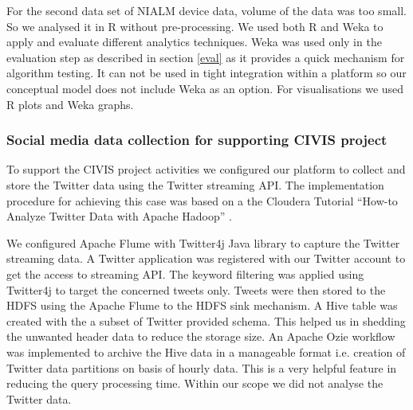  For the second data set of NIALM device data, volume of the data was too small. So we analysed it in R without pre-processing. We used both R and Weka to apply and evaluate different analytics techniques. Weka was used only in the evaluation step as described in section \ref{eval} as it provides a quick mechanism for algorithm testing. It can not be used in tight integration within a platform so our conceptual model does not include Weka as an option. For visualisations we used R plots and Weka graphs.
 
 \subsubsection{Social media data collection for supporting CIVIS project}
 To support the CIVIS project activities we configured our platform to collect and store the Twitter data using the Twitter streaming API. The implementation procedure for achieving this case was based on a the Cloudera Tutorial ``How-to Analyze Twitter Data with Apache Hadoop'' \cite{Clouderatwitter}.
 
 We configured Apache Flume with Twitter4j Java library to  capture the Twitter streaming data. A Twitter application was registered with our Twitter account to get the access to streaming API. The keyword filtering was applied using Twitter4j to target the concerned tweets only. Tweets were then stored to the HDFS using the Apache Flume to the HDFS sink mechanism. A Hive table was created with the a subset of Twitter provided schema. This helped us in shedding the unwanted header data to reduce the storage size. An Apache Ozie workflow was implemented to archive the Hive data in a manageable format i.e. creation of Twitter data partitions on basis of hourly data. This is a very helpful feature in reducing the query processing time. Within our scope we did not analyse the Twitter data.    
